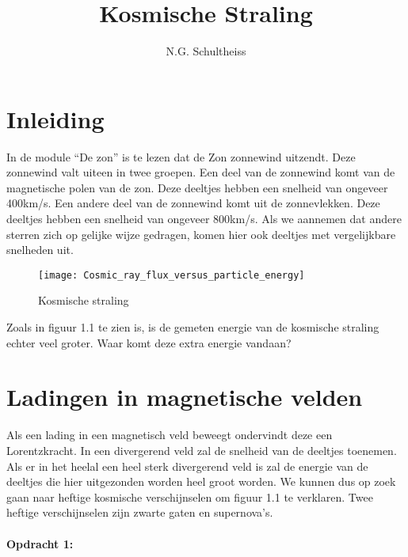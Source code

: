 



\title{Kosmische Straling}
\author{N.G. Schultheiss}
\date{}

\maketitle
\thispagestyle{firststyle}

\section{Inleiding}

In de module ``De zon'' is te lezen dat de Zon zonnewind uitzendt.
Deze zonnewind valt uiteen in twee groepen. Een deel van de zonnewind
komt van de magnetische polen van de zon. Deze deeltjes hebben een
snelheid van ongeveer 400km/s. Een andere deel van de zonnewind komt
uit de zonnevlekken. Deze deeltjes hebben een snelheid van ongeveer
800km/s. Als we aannemen dat andere sterren zich op gelijke wijze
gedragen, komen hier ook deeltjes met vergelijkbare snelheden uit.

\begin{figure}[h]
\noindent \begin{centering}
\texttt{[image: Cosmic\_ray\_flux\_versus\_particle\_energy]}
\par\end{centering}

\caption{Kosmische straling}
\end{figure}


Zoals in figuur 1.1 te zien is, is de gemeten energie van de kosmische
straling echter veel groter. Waar komt deze extra energie vandaan?


\section{Ladingen in magnetische velden}

Als een lading in een magnetisch veld beweegt ondervindt deze een
Lorentzkracht. In een divergerend veld zal de snelheid van de deeltjes
toenemen. Als er in het heelal een heel sterk divergerend veld is
zal de energie van de deeltjes die hier uitgezonden worden heel groot
worden. We kunnen dus op zoek gaan naar heftige kosmische verschijnselen
om figuur 1.1 te verklaren. Twee heftige verschijnselen zijn zwarte
gaten en supernova's.


\paragraph*{Opdracht 1:}

